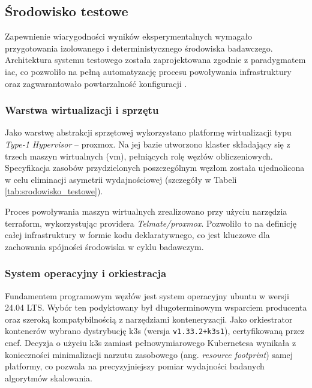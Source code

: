 \subsection{Środowisko testowe}
\label{subsec:srodowisko_testowe}

Zapewnienie wiarygodności wyników eksperymentalnych wymagało przygotowania izolowanego i deterministycznego środowiska 
badawczego. Architektura systemu testowego została zaprojektowana zgodnie z paradygmatem \gls{iac}, co pozwoliło na 
pełną automatyzację procesu powoływania infrastruktury oraz zagwarantowało powtarzalność 
konfiguracji \cite{hinschner2018infrastructure}.

\subsubsection{Warstwa wirtualizacji i sprzętu}

Jako warstwę abstrakcji sprzętowej wykorzystano platformę wirtualizacji typu \textit{Type-1 Hypervisor} -- \gls{proxmox}.
Na jej bazie utworzono klaster składający się z trzech maszyn wirtualnych (\gls{vm}), pełniących rolę węzłów obliczeniowych.
Specyfikacja zasobów przydzielonych poszczególnym węzłom została ujednolicona w celu eliminacji asymetrii wydajnościowej 
(szczegóły w Tabeli \ref{tab:srodowisko_testowe}).

Proces powoływania maszyn wirtualnych zrealizowano przy użyciu narzędzia \gls{terraform}, wykorzystując providera 
\textit{Telmate/proxmox}. Pozwoliło to na definicję całej infrastruktury w formie kodu deklaratywnego, co jest kluczowe 
dla zachowania spójności środowiska w cyklu badawczym.

\subsubsection{System operacyjny i orkiestracja}

Fundamentem programowym węzłów jest system operacyjny \gls{ubuntu} w wersji 24.04 LTS. Wybór ten podyktowany był 
długoterminowym wsparciem producenta oraz szeroką kompatybilnością z narzędziami konteneryzacji. Jako orkiestrator 
kontenerów wybrano dystrybucję \gls{k3s} (wersja \texttt{v1.33.2+k3s1}), certyfikowaną przez \gls{cncf}. Decyzja o 
użyciu \gls{k3s} zamiast pełnowymiarowego Kubernetesa wynikała z konieczności minimalizacji narzutu zasobowego 
(ang. \textit{resource footprint}) samej platformy, co pozwala na precyzyjniejszy pomiar wydajności badanych 
algorytmów skalowania.

